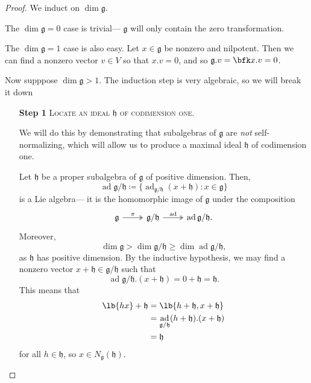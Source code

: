 \documentclass{article}
\DeclarePairedDelimiter\lb\lbrack\rbrack
\DeclareMathOperator{\ad}{ad}
\newcommand*\frkg{{\ensuremath{\mathfrak{g}}}}
\newcommand*\frkh{{\ensuremath{\mathfrak{h}}}}
\newcommand*\acts{.}
\begin{document}
\begin{proof}
    We induct on $\dim \frkg$.

    The $\dim \frkg = 0$ case is trivial--- $\frkg$ will only contain the zero transformation.

    The $\dim \frkg = 1$ case is also easy.
    Let $x \in \frkg$ be nonzero and nilpotent.
    Then  we can find a nonzero vector $v \in V$ so that $x \acts v = 0$, and so $\frkg \acts v = \bfk x \acts v = 0$.

    Now supppose $\dim \frkg > 1$.
    The induction step is very algebraic, so we will break it down
    \begin{itemize}
        \item[\textbf{Step 1}] 
            \textsc{\color{Crimson} Locate an ideal $\frkh$ of codimension one.}

            We will do this by demonstrating that subalgebras of $\frkg$ are \textit{not} self-normalizing, which will allow us to produce a maximal ideal $\frkh$ of codimension one.

            Let $\frkh$ be a proper subalgebra of $\frkg$ of positive dimension.
            Then,
            \[
                \ad \frkg/\frkh
                \coloneq
                \Big\{
                    \ad_{\frkg/\frkh}(x + \frkh)
                    :
                    x \in \frkg
                \Big\}
            \]
            is a Lie algebra--- it is the homomorphic image of $\frkg$ under the composition
            \[
                \begin{tikzcd}
                    \frkg \arrow[r, "\pi", two heads] & \frkg/\frkh \arrow[r, "\ad", two heads] & \ad \frkg/\frkh. 
                \end{tikzcd}
            \]
            Moreover, 
            \[
                \dim \frkg > \dim \frkg/\frkh \geq \dim \ad \frkg/\frkh,
            \]
            as $\frkh$ has positive dimension.
            By the inductive hypothesis, we may find a nonzero vector $x + \frkh \in \frkg/\frkh$ such that
            \[
                \ad \frkg/\frkh \acts (x + \frkh) 
                = 
                0 + \frkh = \frkh.
            \]
            This means that
            \begin{align*}
                \lb{hx} + \frkh
                &=
                \lb{h + \frkh, x + \frkh}
                \\
                &=
                \ad_{\frkg/\frkh} (h + \frkh) \acts (x + \frkh) 
                \\
                &= 
                \frkh
            \end{align*}
            for all $h \in \frkh$, so $x \in N_\frkg(\frkh)$.


\end{itemize}
\end{proof}
\end{document}

